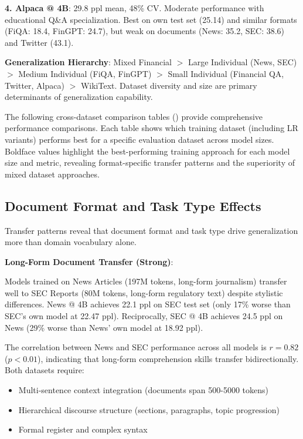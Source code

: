 \textbf{4. Alpaca @ 4B}: 29.8 ppl mean, 48\% CV. Moderate performance with educational Q\&A specialization. Best on own test set (25.14) and similar formats (FiQA: 18.4, FinGPT: 24.7), but weak on documents (News: 35.2, SEC: 38.6) and Twitter (43.1).

\textbf{Generalization Hierarchy}: Mixed Financial $>$ Large Individual (News, SEC) $>$ Medium Individual (FiQA, FinGPT) $>$ Small Individual (Financial QA, Twitter, Alpaca) $>$ WikiText. Dataset diversity and size are primary determinants of generalization capability.

The following cross-dataset comparison tables () provide comprehensive performance comparisons. Each table shows which training dataset (including LR variants) performs best for a specific evaluation dataset across model sizes. Boldface values highlight the best-performing training approach for each model size and metric, revealing format-specific transfer patterns and the superiority of mixed dataset approaches.

\subsection{Document Format and Task Type Effects}

Transfer patterns reveal that document format and task type drive generalization more than domain vocabulary alone.

\textbf{Long-Form Document Transfer (Strong)}:

Models trained on News Articles (197M tokens, long-form journalism) transfer well to SEC Reports (80M tokens, long-form regulatory text) despite stylistic differences. News @ 4B achieves 22.1 ppl on SEC test set (only 17\% worse than SEC's own model at 22.47 ppl). Reciprocally, SEC @ 4B achieves 24.5 ppl on News (29\% worse than News' own model at 18.92 ppl).

The correlation between News and SEC performance across all models is $r = 0.82$ ($p < 0.01$), indicating that long-form comprehension skills transfer bidirectionally. Both datasets require:
\begin{itemize}
\item Multi-sentence context integration (documents span 500-5000 tokens)
\item Hierarchical discourse structure (sections, paragraphs, topic progression)
\item Formal register and complex syntax
\end{itemize}

